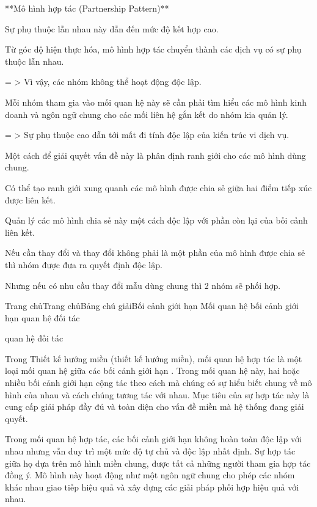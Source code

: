 

**Mô hình hợp tác (Partnership Pattern)**

Sự phụ thuộc lẫn nhau này dẫn đến mức độ kết hợp cao.

Từ góc độ hiện thực hóa, mô hình hợp tác chuyển thành các dịch vụ có sự phụ thuộc lẫn nhau.

= > Vì vậy, các nhóm không thể hoạt động độc lập.

Mỗi nhóm tham gia vào mối quan hệ này sẽ cần phải tìm hiểu các mô hình kinh doanh và ngôn ngữ chung cho các mối liên hệ gắn kết do nhóm kia quản lý.

= > Sự phụ thuộc cao dẫn tới mất đi tính độc lập của kiến trúc vi dịch vụ.

Một cách để giải quyết vấn đề này là phân định ranh giới cho các mô hình dùng chung.

Có thể tạo ranh giới xung quanh các mô hình được chia sẻ giữa hai điểm tiếp xúc được liên kết.

Quản lý các mô hình chia sẻ này một cách độc lập với phần còn lại của bối cảnh liên kết.

Nếu cần thay đổi và thay đổi không phải là một phần của mô hình được chia sẻ thì nhóm được đưa ra quyết định độc lập.

Nhưng nếu có nhu cầu thay đổi mẫu dùng chung thì 2 nhóm sẽ phối hợp.




Trang chủTrang chủBảng chú giảiBối cảnh giới hạn Mối quan hệ bối cảnh giới hạn quan hệ đối tác

quan hệ đối tác

Trong Thiết kế hướng miền (thiết kế hướng miền), mối quan hệ hợp tác là một loại mối quan hệ giữa các bối cảnh giới hạn . Trong mối quan hệ này, hai hoặc nhiều bối cảnh giới hạn cộng tác theo cách mà chúng có sự hiểu biết chung về mô hình của nhau và cách chúng tương tác với nhau. Mục tiêu của sự hợp tác này là cung cấp giải pháp đầy đủ và toàn diện cho vấn đề miền mà hệ thống đang giải quyết.

Trong mối quan hệ hợp tác, các bối cảnh giới hạn không hoàn toàn độc lập với nhau nhưng vẫn duy trì một mức độ tự chủ và độc lập nhất định. Sự hợp tác giữa họ dựa trên mô hình miền chung, được tất cả những người tham gia hợp tác đồng ý. Mô hình này hoạt động như một ngôn ngữ chung cho phép các nhóm khác nhau giao tiếp hiệu quả và xây dựng các giải pháp phối hợp hiệu quả với nhau.

